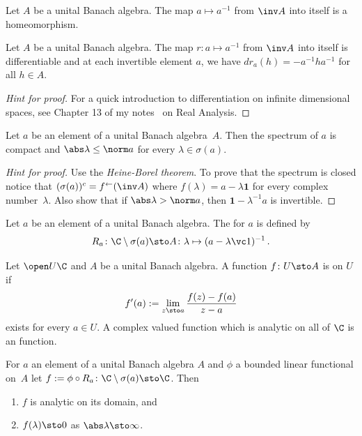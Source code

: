 \begin{prop}\label{000646fa} Let $A$ be a unital Banach algebra.  The map $a \mapsto a^{-1}$ from $\inv A$ into
itself is a homeomorphism.
\end{prop}

\begin{prop} Let $A$ be a unital Banach algebra.  The map $r\colon a \mapsto a^{-1}$ from
$\inv A$ into itself is differentiable and at each invertible element $a$, we have
$dr_a(h) = -a^{-1}ha^{-1}$ for all $h \in A$.
\end{prop}

\begin{proof}[\emph{Hint for proof}] For a quick introduction to differentiation on infinite dimensional
spaces, see Chapter 13 of my notes~\cite{Erdman:2007} on Real Analysis.  \ns
\end{proof}

\begin{prop}\label{000661} Let $a$ be an element of a unital Banach algebra~$A$.  Then the spectrum of $a$
is compact and $\abs\lambda \le \norm a$ for every $\lambda \in \sigma(a)$.
\end{prop}

\begin{proof}[\emph{Hint for proof}] Use the \emph{Heine-Borel theorem}.  To prove that the
spectrum is closed notice that $(\sigma(a))^c = f^\gets(\inv A)$ where $f(\lambda) = a -
\lambda\mathbf 1$ for every complex number~$\lambda$. Also show that if $\abs\lambda >
\norm a$, then $\mathbf 1 - \lambda^{-1}a$ is invertible.  \ns
\end{proof}

\begin{defn}  Let $a$ be an element of a unital Banach algebra.  The
 for $a$ is defined by
   \[ R_a \colon \C \setminus \sigma(a) \sto A
                 \colon \lambda \mapsto (a  - \lambda\vc 1)^{-1}\,. \]
\end{defn}

\begin{defn} Let $\open U\C$ and $A$ be a unital Banach algebra. A function $f \colon U \sto A$
is  on $U$ if
   \[ f'(a) := \lim_{z \sto a} \frac{f(z) - f(a)}{z - a} \]
exists for every $a \in U$.  A complex valued function which is analytic on all of $\C$
is an
 function.
\end{defn}

\begin{prop} For $a$ an element of a unital Banach algebra $A$ and $\phi$ a bounded linear
functional on~$A$ let $f := \phi \circ R_a \colon \C \setminus \sigma(a) \sto \C$.  Then
 \begin{enumerate}[label=\rm{(\alph*)}]
  \item $f$ is analytic on its domain, and
  \item $f(\lambda) \sto 0$ as $\abs\lambda \sto \infty$.
 \end{enumerate}
\end{prop}

